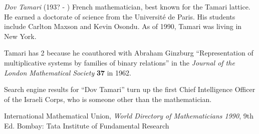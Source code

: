 \documentclass[12pt]{article}
\begin{document}
\emph{Dov Tamari} (193? - ) French mathematician, best known for the Tamari lattice. He earned a doctorate of science from the Universit\'e de Paris. His students include Carlton Maxson and Kevin Osondu. As of 1990, Tamari was living in New York.

Tamari has  2 because he coauthored with Abraham Ginzburg ``Representation of multiplicative systems by families of binary relations'' in the {\it Journal of the London Mathematical Society} {\bf 37} in 1962.

Search engine results for ``Dov Tamari'' turn up the first Chief Intelligence Officer of the Israeli Corps, who is someone other than the mathematician.

\begin{thebibliography}{1}
 International Mathematical Union, {\it World Directory of Mathematicians 1990}, 9th Ed. Bombay: Tata Institute of Fundamental Research
\end{thebibliography}
\end{document}
